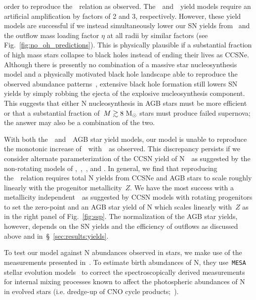 \documentclass[ms.tex]{subfiles}
\begin{document}
order to reproduce the~\ohno~relation as observed.
The~\cristallo~and~\ventura~yield models require an artificial amplification by
factors of 2 and 3, respectively.
However, these yield models are successful if we instead simultaneously lower
our SN yields from~\citet{Johnson2021} and the outflow mass loading factor
$\eta$ at all radii by similar factors (see Fig.~\ref{fig:no_oh_predictions}).
This is physically plausible if a substantial fraction of high mass stars
collapse to black holes instead of ending their lives as CCSNe.
Although there is presently no combination of a massive star nucleosynthesis
model and a physically motivated black hole landscape able to reproduce the
observed abundance patterns~\citep{Griffith2021a}, extensive black hole
formation still lowers SN yields by simply robbing the ejecta of the explosive
nucleosynthesis component.
This suggests that either N nucleosynthesis in AGB stars must be more efficient 
or that a substantial fraction of~$M \gtrsim 8~\text{M}_\odot$ stars must produce
failed supernova; the answer may also be a combination of the two.
\par
With both the~\karakasten~and~\karakas~AGB star yield models, our model is
unable to reproduce the monotonic increase of~\no~with~\oh~as observed.
This discrepancy persists if we consider alternate parameterization of the
CCSN yield of N~~as suggested by the non-rotating models of
\citet{Woosley1995},~\citet{Nomoto2013},~\citet{Sukhbold2016}, and
\citet{Limongi2018}.
In general, we find that reproducing the~\ohno~relation requires total N
yields from CCSNe and AGB stars to scale roughly linearly with the progenitor
metallicity~$Z$.
We have the most success with a metallicity independent~~as suggested
by CCSN models with rotating progenitors to set the zero-point and an AGB
star yield of N which scales linearly with~$Z$ as in the right panel of
Fig.~\ref{fig:ssp}.
The normalization of the AGB star yields, however, depends on the SN yields and
the efficiency of outflows as discussed above and
in~\S~\ref{sec:results:yields}.
\par
To test our model against N abundances observed in stars, we make use of the
measurements presented in~\citet{Vincenzo2021}.
To estimate birth abundances of N, they use~\texttt{MESA} stellar evolution
models~\citep{Paxton2011, Paxton2013, Paxton2015, Paxton2018} to correct the
spectroscopically derived measurements for internal mixing processes known to
affect the photospheric abundances of N in evolved stars (i.e. dredge-up of
CNO cycle products;~\citealp{Gilroy1989, Korn2007, Lind2008, Souto2018,
Souto2019}).
\end{document}
